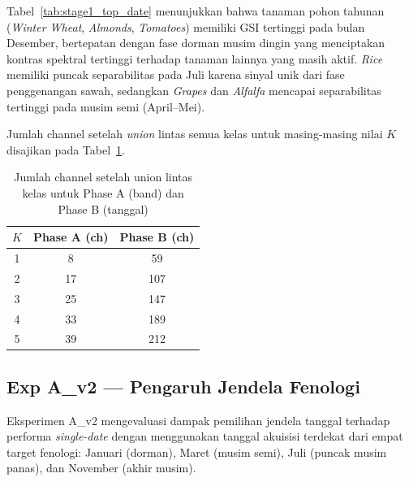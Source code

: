Tabel~\ref{tab:stage1_top_date} menunjukkan bahwa tanaman pohon tahunan (\textit{Winter Wheat},
\textit{Almonds}, \textit{Tomatoes}) memiliki GSI tertinggi pada bulan Desember, bertepatan
dengan fase dorman musim dingin yang menciptakan kontras spektral tertinggi terhadap tanaman
lainnya yang masih aktif. \textit{Rice} memiliki puncak separabilitas pada Juli karena sinyal
unik dari fase penggenangan sawah, sedangkan \textit{Grapes} dan \textit{Alfalfa} mencapai
separabilitas tertinggi pada musim semi (April--Mei).

Jumlah channel setelah \textit{union} lintas semua kelas untuk masing-masing nilai $K$ disajikan
pada Tabel~\ref{tab:channel_counts}.

\begin{table}[H]
    \centering
    \caption{Jumlah channel setelah union lintas kelas untuk Phase A (band) dan Phase B (tanggal)}
    \label{tab:channel_counts}
    \begin{tabular}{|c|c|c|}
    \hline
    $K$ & \textbf{Phase A (ch)} & \textbf{Phase B (ch)} \\
    \hline
    1 & 8   & 59  \\
    2 & 17  & 107 \\
    3 & 25  & 147 \\
    4 & 33  & 189 \\
    5 & 39  & 212 \\
    \hline
    \end{tabular}
\end{table}

\subsection{Exp A\_v2 — Pengaruh Jendela Fenologi}

Eksperimen A\_v2 mengevaluasi dampak pemilihan jendela tanggal terhadap performa \textit{single-date}
dengan menggunakan tanggal akuisisi terdekat dari empat target fenologi: Januari (dorman),
Maret (musim semi), Juli (puncak musim panas), dan November (akhir musim).

